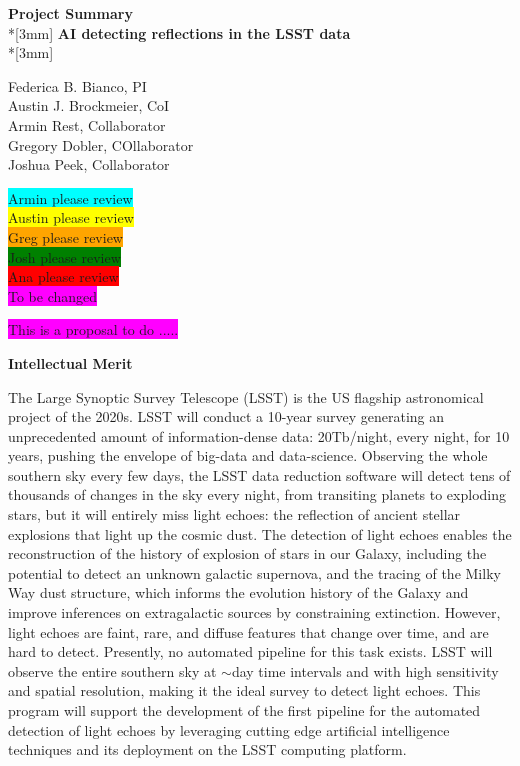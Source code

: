 \documentclass{proposalnsf}
\newcommand{\armin}[1]{\colorbox{cyan}{#1}}
\newcommand{\austin}[1]{\colorbox{yellow}{#1}}
\newcommand{\greg}[1]{\colorbox{orange}{#1}}
\newcommand{\josh}[1]{\colorbox{green}{#1}}
\newcommand{\ana}[1]{\colorbox{red}{#1}}
\newcommand{\changeit}[1]{\colorbox{magenta}{#1}}
\begin{document}
\begin{center}
{\Large{\bf Project Summary}}\\*[3mm]
{\bf AI detecting reflections in the LSST data} \\*[3mm]

Federica B. Bianco, PI \\
Austin J. Brockmeier, CoI\\
Armin Rest, Collaborator\\
Gregory Dobler, COllaborator\\
Joshua Peek, Collaborator
\end{center}

{\LARGE{
\noindent
\armin{Armin please review}\\
\austin{Austin please review}\\
\greg{Greg please review}\\
\josh{Josh please review}\\
\ana{Ana please review}\\
\changeit{To be changed}}}

\medskip
\medskip
\medskip

\changeit{This is a  proposal to do .....}

\medskip
\noindent
{\bf Intellectual Merit}

The Large Synoptic Survey Telescope (LSST) is the US flagship astronomical project of the 2020s.  LSST will conduct a 10-year survey generating an unprecedented amount of information-dense data: 20Tb/night, every night, for 10 years, pushing the envelope of big-data and data-science.  Observing the whole southern sky every few days, the LSST data reduction software will detect tens of thousands of changes in the sky every night, from transiting planets to exploding stars, but it will entirely miss light echoes: the reflection of ancient stellar explosions that light up the cosmic dust.  The detection of light echoes enables the reconstruction of the history of explosion of stars in our Galaxy, including the potential to detect an unknown galactic supernova, and the tracing of the Milky Way dust structure, which informs the evolution history of the Galaxy and improve inferences on extragalactic sources by constraining extinction. However, light echoes are faint, rare, and diffuse features that change over time, and are hard to detect.  Presently, no automated pipeline for this task exists. LSST will observe the entire southern sky at $\sim$day time intervals and with high sensitivity and spatial resolution, making it the ideal survey to detect light echoes.  This program will support the development of the first pipeline for the automated detection of light echoes by leveraging cutting edge artificial intelligence techniques and its deployment on the LSST computing platform. 
\medskip
\end{document}
